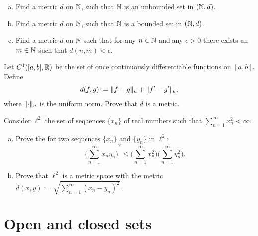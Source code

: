 \begin{exercise}
\leavevmode
\begin{enumerate}[a)]
\item
Find a metric $d$ on ${\mathbb{N}}$, such that ${\mathbb{N}}$ is an unbounded set in $({\mathbb{N}},d)$.
\item
Find a metric $d$ on ${\mathbb{N}}$, such that ${\mathbb{N}}$ is a bounded set in $({\mathbb{N}},d)$.
\item
Find a metric $d$ on ${\mathbb{N}}$ such that for any $n \in {\mathbb{N}}$ and any $\epsilon > 0$
there exists an $m \in {\mathbb{N}}$ such that $d(n,m) < \epsilon$.
\end{enumerate}
\end{exercise}

\begin{exercise} \label{exercise:C1ab}
Let $C^1([a,b],{\mathbb{R}})$ be the set of once continuously differentiable
functions on $[a,b]$.
Define
\begin{equation*}
d(f,g) := \lVert {f-g} \rVert_u + \lVert {f'-g'} \rVert_u,
\end{equation*}
where $\lVert {\cdot} \rVert_u$ is the uniform norm.  Prove that $d$ is a metric.
\end{exercise}

\begin{samepage}
\begin{exercise}
Consider $\ell^2$ the set of sequences $\{ x_n \}$
of real numbers
such that $\sum_{n=1}^\infty x_n^2 < \infty$.
\begin{enumerate}[a)]
\item
Prove the  for two sequences
$\{x_n \}$ and $\{ y_n \}$ in $\ell^2$:
\begin{equation*}
{\biggl( \sum_{n=1}^\infty x_n y_n \biggr)}^2
\leq
\biggl(\sum_{n=1}^\infty x_n^2 \biggr)
\biggl(\sum_{n=1}^\infty y_n^2 \biggr) .
\end{equation*}
\item
Prove that $\ell^2$ is a metric space with the metric
$d(x,y) := \sqrt{\sum_{n=1}^\infty {(x_n-y_n)}^2}$.
\end{enumerate}
\end{exercise}
\end{samepage}


\sectionnewpage
\section{Open and closed sets}
\label{sec:mettop}

